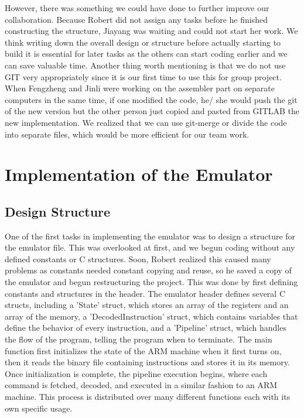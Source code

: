 \documentclass[11pt]{article}
\begin{document}
\noindent
However, there was something we could have done to further improve our collaboration. Because Robert did not assign any tasks before he finished constructing the structure, Jiayang was waiting and could not start her work. We think writing down the overall design or structure before actually starting to build it is essential for later tasks as the others can start coding earlier and we can save valuable time. Another thing worth mentioning is that we do not use GIT very appropriately since it is our first time to use this for group project. When Fengzheng and Jinli were working on the assembler part on separate computers in the same time, if one modified the code, he/ she would push the git of the new version but the other person just copied and pasted from GITLAB the new implementation. We realized that we can use git-merge or divide the code into separate files, which would be more efficient for our team work.


\section{Implementation of the Emulator}

\subsection{Design Structure}
One of the first tasks in implementing the emulator was to design a structure for the emulator file. This was overlooked at first, and we begun coding without any defined constants or C structures. Soon, Robert realized this caused many problems as constants needed constant copying and reuse, so he saved a copy of the emulator and begun restructuring the project. This was done by first defining constants and structures in the header. The emulator header defines several C structs, including a 'State' struct, which stores an array of the registers and an array of the memory, a 'DecodedInstruction' struct, which contains variables that define the behavior of every instruction, and a 'Pipeline' struct, which handles the flow of the program, telling the program when to terminate. The main function first initializes the state of the ARM machine when it first turns on, then it reads the binary file containing instructions and stores it in its memory. Once initialization is complete, the pipeline execution begins, where each command is fetched, decoded, and executed in a similar fashion to an ARM machine. This process is distributed over many different functions each with its own specific usage.
\end{document}
